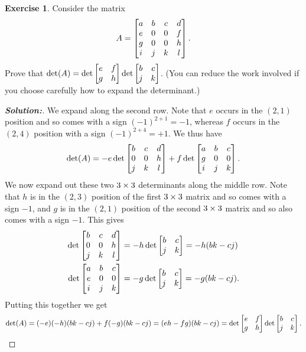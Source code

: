 \documentclass[a4paper]{amsart}
\theoremstyle{definition}
\newtheorem{exercise}{Exercise}
\newenvironment{solution}{\begin{proof}[\textbf{Solution:}] \vphantom{u}}{\end{proof}}
\begin{document}
\begin{exercise}\label{ex-det-ii}
 Consider the matrix
 \[ A = \left[\begin{matrix} a & b & c & d \\
             e & 0 & 0 & f \\
             g & 0 & 0 & h \\
             i & j & k & l \end{matrix}\right].
 \]
 Prove that $\det(A)=\det\left[\begin{matrix} e&f\\g&h\end{matrix}\right]\det\left[\begin{matrix} b&c\\j&k\end{matrix}\right]$.
 (You can reduce the work involved if you choose carefully how to
 expand the determinant.)
\end{exercise}
\begin{solution}
 We expand along the second row.  Note that $e$ occurs in the $(2,1)$
 position and so comes with a sign $(-1)^{2+1}=-1$, whereas $f$ occurs
 in the $(2,4)$ position with a sign $(-1)^{2+4}=+1$.  We thus have
 \[ \det(A) = -e\det\left[\begin{matrix} b&c&d \\ 0&0&h \\ j&k&l \end{matrix}\right]
              +f\det\left[\begin{matrix} a&b&c \\ g&0&0 \\ i&j&k \end{matrix}\right].
 \]
 We now expand out these two $3\times 3$ determinants along the middle
 row.  Note that $h$ is in the $(2,3)$ position of the first $3\times 3$
 matrix and so comes with a sign $-1$, and $g$ is in the $(2,1)$
 position of the second $3\times 3$ matrix and so also comes with a sign
 $-1$.  This gives 
 \begin{align*}
  \det\left[\begin{matrix} b&c&d \\ 0&0&h \\ j&k&l \end{matrix}\right]
   &= -h \det\left[\begin{matrix} b&c\\ j&k \end{matrix}\right] = -h(bk-cj) \\
  \det\left[\begin{matrix} a&b&c \\ e&0&0 \\ i&j&k \end{matrix}\right]
   &= -g \det\left[\begin{matrix} b&c\\ j&k \end{matrix}\right] = -g(bk-cj).
 \end{align*}
 Putting this together we get 
 \[ \det(A) = (-e)(-h)(bk-cj) +f(-g)(bk-cj)
            = (eh-fg)(bk-cj) 
            = \det\left[\begin{matrix} e&f\\g&h\end{matrix}\right]\det\left[\begin{matrix} b&c\\j&k\end{matrix}\right].
 \]
\end{solution}
\end{document}
